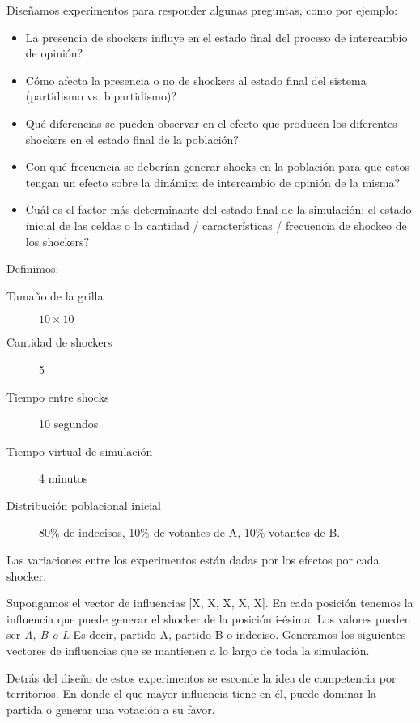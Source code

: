 Diseñamos experimentos para responder algunas preguntas, como por ejemplo:
\begin{itemize}
\item La presencia de shockers influye en el estado final del proceso de intercambio de opinión$?$ 
\item Cómo afecta la presencia o no de shockers al estado final del sistema (partidismo vs. bipartidismo)$?$ 
\item Qué diferencias se pueden observar en el efecto que producen los diferentes shockers en el estado final de la población$?$ 
\item Con qué frecuencia se deberían generar shocks en la población para que estos tengan un efecto sobre la dinámica de intercambio de opinión de la misma?
\item Cuál es el factor más determinante del estado final de la simulación: el estado inicial de las celdas o la cantidad / características / frecuencia de shockeo de los shockers$?$ 
\end{itemize}

Definimos:

\begin{description}
    \item[Tamaño de la grilla]  $10 \times 10$
    \item[Cantidad de shockers] 5
    \item[Tiempo entre shocks] 10 segundos
    \item[Tiempo virtual de simulación] 4 minutos
    \item[Distribución poblacional inicial] 80\% de indecisos, 10\% de votantes de A, 10\% votantes de B.
\end{description}

Las variaciones entre los experimentos están dadas por los efectos por cada shocker.

Supongamos el vector de influencias [X, X, X, X, X]. En cada posición tenemos la influencia que puede generar el shocker de la posición i-ésima. Los valores pueden ser \textit{A, B o I}. Es decir, partido A, partido B o indeciso. Generamos los siguientes vectores de influencias que se mantienen a lo largo de toda la simulación.

Detrás del diseño de estos experimentos se esconde la idea de competencia por territorios. En donde el que mayor influencia tiene en él, puede dominar la partida o generar una votación a su favor.

